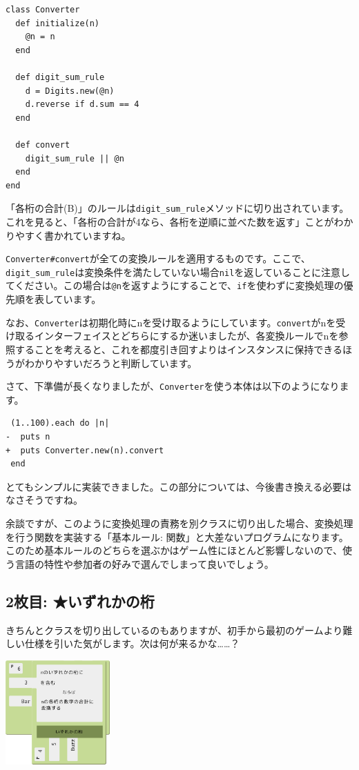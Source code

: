 \documentclass[index]{subfiles}
\begin{document}
\begin{lstlisting}
class Converter
  def initialize(n)
    @n = n
  end

  def digit_sum_rule
    d = Digits.new(@n)
    d.reverse if d.sum == 4
  end

  def convert
    digit_sum_rule || @n
  end
end
\end{lstlisting}

「各桁の合計(B)」のルールは\verb+digit_sum_rule+メソッドに切り出されています。これを見ると、「各桁の合計が4なら、各桁を逆順に並べた数を返す」ことがわかりやすく書かれていますね。

\verb+Converter#convert+が全ての変換ルールを適用するものです。ここで、\verb+digit_sum_rule+は変換条件を満たしていない場合\verb+nil+を返していることに注意してください。この場合は\verb+@n+を返すようにすることで、\verb+if+を使わずに変換処理の優先順を表しています。

なお、\verb+Converter+は初期化時にnを受け取るようにしています。\verb+convert+がnを受け取るインターフェイスとどちらにするか迷いましたが、各変換ルールでnを参照することを考えると、これを都度引き回すよりはインスタンスに保持できるほうがわかりやすいだろうと判断しています。

さて、下準備が長くなりましたが、\verb+Converter+を使う本体は以下のようになります。

\begin{lstlisting}
 (1..100).each do |n|
-  puts n
+  puts Converter.new(n).convert
 end
\end{lstlisting}

とてもシンプルに実装できました。この部分については、今後書き換える必要はなさそうですね。

余談ですが、このように変換処理の責務を別クラスに切り出した場合、変換処理を行う関数を実装する「基本ルール: 関数」と大差ないプログラムになります。このため基本ルールのどちらを選ぶかはゲーム性にほとんど影響しないので、使う言語の特性や参加者の好みで選んでしまって良いでしょう。

  \subsection{2枚目: ★いずれかの桁}

きちんとクラスを切り出しているのもありますが、初手から最初のゲームより難しい仕様を引いた気がします。次は何が来るかな……？

\begin{center}
  \includegraphics[height=4cm]{image/212_replay_2_2.png}
\end{center}
\end{document}
